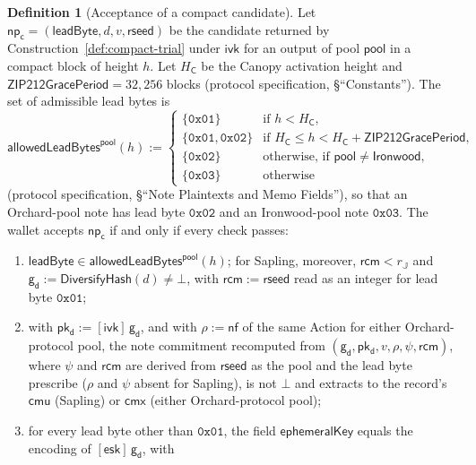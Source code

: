 \documentclass[11pt,a4paper]{article}
\theoremstyle{definition}
\newtheorem{definition}[theorem]{Definition}
\newcommand{\nfsym}{\mathsf{nf}}
\newcommand{\cmx}{\mathsf{cmx}}
\newcommand{\ivk}{\ensuremath{\mathsf{ivk}}}
\newcommand{\pkd}{\ensuremath{\mathsf{pk_d}}}
\newcommand{\gd}{\ensuremath{\mathsf{g_d}}}
\newcommand{\rcm}{\ensuremath{\mathsf{rcm}}}
\begin{document}
\begin{definition}[Acceptance of a compact candidate]\label{def:compact-accept}
Let $\mathsf{np}_{\mathsf{c}} = (\mathsf{leadByte}, d, v, \mathsf{rseed})$
be the candidate returned by Construction~\ref{def:compact-trial} under
$\ivk$ for an output of pool $\mathsf{pool}$ in a compact block of height
$h$. Let $H_{\mathsf{C}}$ be the Canopy activation height and
$\mathsf{ZIP212GracePeriod} = 32{,}256$ blocks (protocol specification,
\S``Constants''). The set of admissible lead bytes is
\[
  \mathsf{allowedLeadBytes}^{\mathsf{pool}}(h) :=
  \begin{cases}
    \{\mathtt{0x01}\} & \text{if } h < H_{\mathsf{C}}, \\
    \{\mathtt{0x01}, \mathtt{0x02}\} & \text{if } H_{\mathsf{C}} \le h <
      H_{\mathsf{C}} + \mathsf{ZIP212GracePeriod}, \\
    \{\mathtt{0x02}\} & \text{otherwise, if } \mathsf{pool} \neq
      \mathsf{Ironwood}, \\
    \{\mathtt{0x03}\} & \text{otherwise}
  \end{cases}
\]
(protocol specification, \S``Note Plaintexts and Memo Fields''), so that
an Orchard-pool note has lead byte $\mathtt{0x02}$ and an Ironwood-pool
note $\mathtt{0x03}$. The wallet accepts $\mathsf{np}_{\mathsf{c}}$ if and
only if every check passes:
\begin{enumerate}[label=(\roman*)]
\item $\mathsf{leadByte} \in \mathsf{allowedLeadBytes}^{\mathsf{pool}}(h)$;
  for Sapling, moreover, $\rcm < r_{\mathbb{J}}$ and
  $\gd := \mathsf{DiversifyHash}(d) \neq \bot$, with $\rcm := \mathsf{rseed}$
  read as an integer for lead byte $\mathtt{0x01}$;
\item with $\pkd := [\ivk]\,\gd$, and with $\rho := \nfsym$ of the same
  Action for either Orchard-protocol pool, the note commitment recomputed
  from $(\gd, \pkd, v, \rho, \psi, \rcm)$, where $\psi$ and $\rcm$ are
  derived from $\mathsf{rseed}$ as the pool and the lead byte prescribe
  ($\rho$ and $\psi$ absent for Sapling), is not $\bot$ and extracts to the
  record's $\mathsf{cmu}$ (Sapling) or $\cmx$ (either Orchard-protocol
  pool);
\item for every lead byte other than $\mathtt{0x01}$, the field
  $\mathsf{ephemeralKey}$ equals the encoding of $[\mathsf{esk}]\,\gd$, with

\end{enumerate}
\end{definition}
\end{document}
